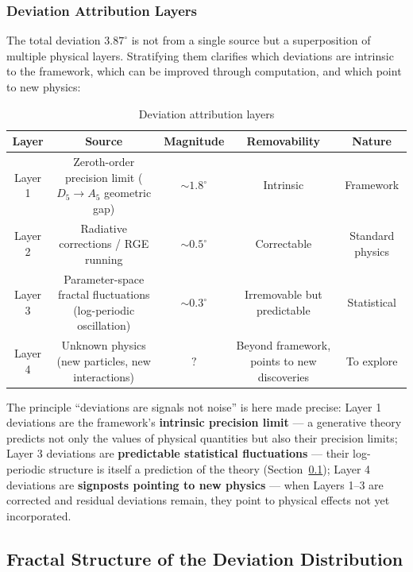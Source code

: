 \documentclass[12pt,a4paper,twocolumn]{article}
\begin{document}
\subsubsection{Deviation Attribution Layers}
\label{subsubsec:deviation_layers_en}

The total deviation $3.87^\circ$ is not from a single source but a superposition of multiple physical layers. Stratifying them clarifies which deviations are intrinsic to the framework, which can be improved through computation, and which point to new physics:

\begin{table}[htbp]
\centering
\caption{Deviation attribution layers}
\label{tab:deviation_layers_en}
\begin{tabular}{ccccc}
\hline
Layer & Source & Magnitude & Removability & Nature \\
\hline
Layer 1 & Zeroth-order precision limit ($D_5 \to A_5$ geometric gap) & $\sim 1.8^\circ$ & Intrinsic & Framework \\
Layer 2 & Radiative corrections / RGE running & $\sim 0.5^\circ$ & Correctable & Standard physics \\
Layer 3 & Parameter-space fractal fluctuations (log-periodic oscillation) & $\sim 0.3^\circ$ & Irremovable but predictable & Statistical \\
Layer 4 & Unknown physics (new particles, new interactions) & $?$ & Beyond framework, points to new discoveries & To explore \\
\hline
\end{tabular}
\end{table}

The principle ``deviations are signals not noise'' is here made precise: Layer 1 deviations are the framework's \textbf{intrinsic precision limit} --- a generative theory predicts not only the values of physical quantities but also their precision limits; Layer 3 deviations are \textbf{predictable statistical fluctuations} --- their log-periodic structure is itself a prediction of the theory (Section~\ref{subsec:deviation_fractal}); Layer 4 deviations are \textbf{signposts pointing to new physics} --- when Layers 1--3 are corrected and residual deviations remain, they point to physical effects not yet incorporated.

\subsection{Fractal Structure of the Deviation Distribution}
\label{subsec:deviation_fractal}
\end{document}
